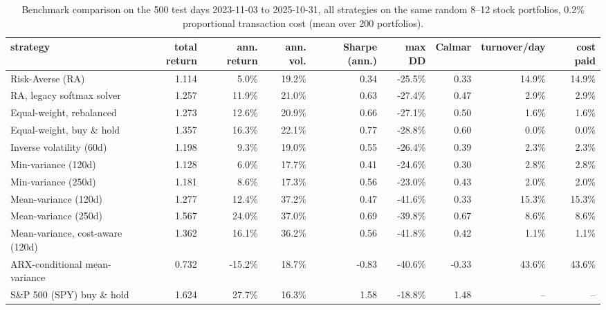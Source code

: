 \begin{table}[ht!]
\centering
\footnotesize
\setlength{\tabcolsep}{4pt}
\begin{tabular}{lrrrrrrrr}
\hline
strategy & total return & ann. return & ann. vol. & Sharpe (ann.) & max DD & Calmar & turnover/day & cost paid \\
\hline
Risk-Averse (RA) & 1.114 & 5.0\% & 19.2\% & 0.34 & -25.5\% & 0.33 & 14.9\% & 14.9\% \\
RA, legacy softmax solver & 1.257 & 11.9\% & 21.0\% & 0.63 & -27.4\% & 0.47 & 2.9\% & 2.9\% \\
Equal-weight, rebalanced & 1.273 & 12.6\% & 20.9\% & 0.66 & -27.1\% & 0.50 & 1.6\% & 1.6\% \\
Equal-weight, buy \& hold & 1.357 & 16.3\% & 22.1\% & 0.77 & -28.8\% & 0.60 & 0.0\% & 0.0\% \\
Inverse volatility (60d) & 1.198 & 9.3\% & 19.0\% & 0.55 & -26.4\% & 0.39 & 2.3\% & 2.3\% \\
Min-variance (120d) & 1.128 & 6.0\% & 17.7\% & 0.41 & -24.6\% & 0.30 & 2.8\% & 2.8\% \\
Min-variance (250d) & 1.181 & 8.6\% & 17.3\% & 0.56 & -23.0\% & 0.43 & 2.0\% & 2.0\% \\
Mean-variance (120d) & 1.277 & 12.4\% & 37.2\% & 0.47 & -41.6\% & 0.33 & 15.3\% & 15.3\% \\
Mean-variance (250d) & 1.567 & 24.0\% & 37.0\% & 0.69 & -39.8\% & 0.67 & 8.6\% & 8.6\% \\
Mean-variance, cost-aware (120d) & 1.362 & 16.1\% & 36.2\% & 0.56 & -41.8\% & 0.42 & 1.1\% & 1.1\% \\
ARX-conditional mean-variance & 0.732 & -15.2\% & 18.7\% & -0.83 & -40.6\% & -0.33 & 43.6\% & 43.6\% \\
S\&P 500 (SPY) buy \& hold & 1.624 & 27.7\% & 16.3\% & 1.58 & -18.8\% & 1.48 & -- & -- \\
\hline
\end{tabular}
\caption{Benchmark comparison on the 500 test days 2023-11-03 to 2025-10-31, all strategies on the same random 8--12 stock portfolios, 0.2\% proportional transaction cost (mean over 200 portfolios).}
\label{tab:bench_mean}
\end{table}
